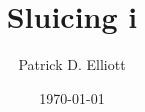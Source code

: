\documentclass[nofonts,nobib]{tufte-handout}
\title{Sluicing i}
\author{Patrick D. Elliott}
\date{\today}
\begin{document}


\maketitle


\newpage

\begin{fullwidth}
\printbibliography
\end{fullwidth}
\end{document}
